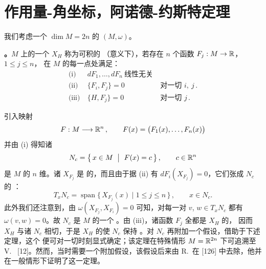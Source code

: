 
\section{作用量-角坐标，阿诺德-约斯特定理}
\label{sec:action-angle-arnold-jost}

%
%
%

我们考虑一个 $\dim M=2n$ 的\trSymplecticManifold{} $(M,\omega)$。

\textbf{\trhDefinition。}\quad $M$ 上的一个\trHamiltonianVectorField{} $X_{H}$ 称为可积的%
（\trLiouville{}意义下），若存在 $n$ 个函数 $F_{j}:M\to\mathbb{R}$，$1\leq j\leq n$，%
在 $M$ 的每一点处满足：
\[
\begin{array}{lll}
\text{(i)}   &\ dF_{1},\dots,dF_{n}\ \text{线性无关} &\\
\text{(ii)}  &\ \{F_{i},F_{j}\}=0 &\ \text{对一切 }i,\ j\,.\\
\text{(iii)} &\ \{H,F_{j}\}=0 &\ \text{对一切 }j\,.
\end{array}
\]

引入映射
\begin{equation}\label{eq:action-map}
F:M\longrightarrow\mathbb{R}^{n}\,,\qquad F(x)=\bigl(F_{1}(x),\dots,F_{n}(x)\bigr)
\end{equation}
并由 (i) 得知诸\trLevelSet
\begin{equation}\label{eq:level-sets}
N_{c}=\bigl\{\,x\in M\ \bigm|\ F(x)=c\,\bigr\}\,,\qquad c\in\mathbb{R}^{n}
\end{equation}
是 $M$ 的 $n$ 维\trSubmanifold。诸\trHamiltonianVectorField{} $X_{F_{j}}$ 是%
\trLinearlyIndependent{}的，而且由于据 (ii) 有 $dF_{i}(X_{F_{j}})=0$，它们张成 $N_{c}$ 的%
\trTangentSpace：
\[
T_{x}N_{c}=\operatorname{span}\{\,X_{F_{j}}(x)\mid 1\leq j\leq n\,\}\,,\qquad x\in N_{c}.
\]
此外我们还注意到，由 $\omega(X_{F_{j}},X_{F_{i}})=0$ 可知，对每一对%
$v$, $w\in T_{x}N_{c}$ 都有 $\omega(v,w)=0$。故 $N_{c}$ 是 $M$ 的一个%
\trLagrange{}\trSubmanifold。由 (iii)，诸函数 $F_{j}$ 全都是 $X_{H}$ 的\trFirstIntegral，%
因而 $X_{H}$ 与诸\trLevelSet{} $N_{c}$ 相切，于是 $X_{H}$ 的\trFlow{}使 $N_{c}$ 保持%
\trInvariant。对 $N_{c}$ 再附加一个\trTopology{}假设，借助于下述定理，这个\trFlow{}%
便可对一切时刻显式确定；该定理在特殊情形 $M=\mathbb{R}^{2n}$ 下可追溯至%
V.~\trArnold{} [12]。然而，\trArnold{}当时需要一个附加假设，该假设后来由%
R.~\trJost{}在 [126] 中去除，他并在一般情形下证明了这一定理。

